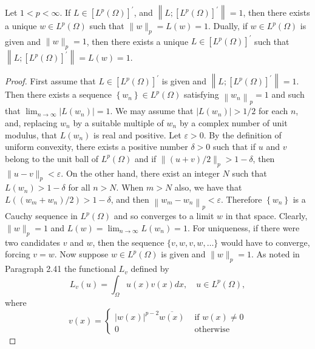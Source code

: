\begin{lemma}
  Let $1<p<\infty$. If $L \in\left[L^p(\Omega)\right]^{\prime}$, and $\left\|L ;\left[L^p(\Omega)\right]^{\prime}\right\|=1$, then there exists a unique $w \in L^p(\Omega)$ such that $\|w\|_p=L(w)=1$. Dually, if $w \in L^p(\Omega)$ is given and $\|w\|_p=1$, then there exists a unique $L \in\left[L^p(\Omega)\right]^{\prime}$ such that $\left\|L ;\left[L^p(\Omega)\right]^{\prime}\right\|=L(w)=1$.
\end{lemma}

\begin{proof}
  First assume that $L \in\left[L^p(\Omega)\right]^{\prime}$ is given and $\left\|L ;\left[L^p(\Omega)\right]^{\prime}\right\|=1$. Then there exists a sequence $\left\{w_n\right\} \in L^p(\Omega)$ satisfying $\left\|w_n\right\|_p=1$ and such that $\lim _{n \rightarrow \infty}\left|L\left(w_n\right)\right|=1$. We may assume that $\left|L\left(w_n\right)\right|>1 / 2$ for each $n$, and, replacing $w_n$ by a suitable multiple of $w_n$ by a complex number of unit modulus, that $L\left(w_n\right)$ is real and positive. Let $\varepsilon>0$. By the definition of uniform convexity, there exists a positive number $\delta>0$ such that if $u$ and $v$ belong to the unit ball of $L^p(\Omega)$ and if $\|(u+v) / 2\|_p>1-\delta$, then $\|u-v\|_p<\varepsilon$. On the other hand, there exist an integer $N$ such that $L\left(w_n\right)>1-\delta$ for all $n>N$. When $m>N$ also, we have that $L\left(\left(w_m+w_n\right) / 2\right)>1-\delta$, and then $\left\|w_m-w_n\right\|_p<\varepsilon$. Therefore $\left\{w_n\right\}$ is a Cauchy sequence in $L^p(\Omega)$ and so converges to a limit $w$ in that space. Clearly, $\|w\|_p=1$ and $L(w)=\lim _{n \rightarrow \infty} L\left(w_n\right)=1$. For uniqueness, if there were two candidates $v$ and $w$, then the sequence $\{v, w, v, w, \ldots\}$ would have to converge, forcing $v=w$.
  Now suppose $w \in L^p(\Omega)$ is given and $\|w\|_p=1$. As noted in Paragraph 2.41 the functional $L_v$ defined by
  \begin{equation}\label{eq:2.35}
    L_v(u)=\int_{\Omega} u(x) v(x) d x, \quad u \in L^p(\Omega),
  \end{equation}
  where
  \begin{equation}\label{eq:2.36}
    v(x)= \begin{cases}|w(x)|^{p-2} \overline{w(x)} & \text { if } w(x) \neq 0 \\ 0 & \text { otherwise }\end{cases}
  \end{equation}

\end{proof}
